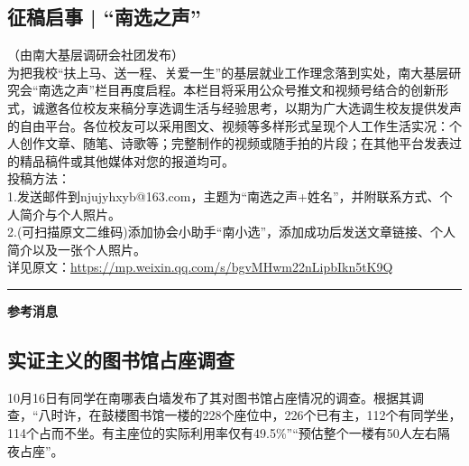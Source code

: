 \documentclass[letterpaper, 12pt]{article}
\begin{document}
\begin{multicols}{2}
\section{征稿启事 | “南选之声”}
（由南大基层调研会社团发布）\\
为把我校“扶上马、送一程、关爱一生”的基层就业工作理念落到实处，南大基层研究会“南选之声”栏目再度启程。本栏目将采用公众号推文和视频号结合的创新形式，诚邀各位校友来稿分享选调生活与经验思考，以期为广大选调生校友提供发声的自由平台。各位校友可以采用图文、视频等多样形式呈现个人工作生活实况：个人创作文章、随笔、诗歌等；完整制作的视频或随手拍的片段；在其他平台发表过的精品稿件或其他媒体对您的报道均可。\\
投稿方法：\\
1.发送邮件到njujyhxyb@163.com，主题为“南选之声+姓名”，并附联系方式、个人简介与个人照片。\\
2.(可扫描原文二维码)添加协会小助手“南小选”，添加成功后发送文章链接、个人简介以及一张个人照片。\\
详见原文：\url{https://mp.weixin.qq.com/s/bgvMHwm22nLipbIkn5tK9Q}

\end{multicols} 
\hrule
\vspace{4mm}
\centerline{\huge\textbf{参考消息}}
\begin{multicols}{2}
\section{实证主义的图书馆占座调查}
10月16日有同学在南哪表白墙发布了其对图书馆占座情况的调查。根据其调查，“八时许，在鼓楼图书馆一楼的228个座位中，226个已有主，112个有同学坐，114个占而不坐。有主座位的实际利用率仅有49.5\%”“预估整个一楼有50人左右隔夜占座”。
\end{multicols} 
\end{document}
